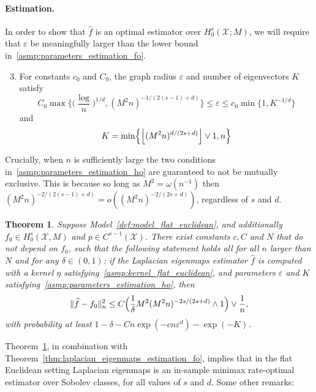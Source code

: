 \documentclass{article}
\newcommand{\floor}[1]{\left\lfloor #1 \right\rfloor}
\newcommand{\1}{\mathbf{1}}
\newcommand{\mc}[1]{\mathcal{#1}}
\newcommand{\wh}[1]{\widehat{#1}}
\theoremstyle{alden}
\theoremstyle{aldenthm}
\newtheorem{theorem}{Theorem}
\theoremstyle{definition}
\theoremstyle{remark}
\begin{document}
\paragraph{Estimation.}
In order to show that $\wh{f}$ is an optimal estimator over $H_0^s(\mc{X};M)$, we will require that $\varepsilon$ be meaningfully larger than the lower bound in~\ref{asmp:parameters_estimation_fo}.
\begin{enumerate}[label=(P\arabic*)]
	\setcounter{enumi}{2}
	\item 
	\label{asmp:parameters_estimation_ho}
	For constants $c_0$ and $C_0$, the graph radius $\varepsilon$ and number of eigenvectors $K$ satisfy
	\begin{equation}
	\label{eqn:radius_ho}
	C_0\max\biggl\{\biggl(\frac{\log}{n}\biggr)^{1/d}, (M^2n)^{-1/(2(s - 1) + d)}\biggr\} \leq \varepsilon \leq c_0\min\{1, K^{-1/d}\}
	\end{equation}
	and
	\begin{equation*}
	K = \min\Bigl\{\floor{(M^2n)^{d/(2s + d)}} \vee 1,n\Bigr\}
	\end{equation*}
\end{enumerate}
Crucially, when $n$ is sufficiently large the two conditions in~\ref{asmp:parameters_estimation_ho} are guaranteed to not be mutually exclusive. This is because so long as $M^2 = \omega(n^{-1})$ then $(M^2n)^{-2/(2(s - 1) + d)} = o((M^2n)^{-2/(2s + d)})$, regardless of $s$ and $d$.
\begin{theorem}
	\label{thm:laplacian_eigenmaps_estimation_ho}
	Suppose Model~\ref{def:model_flat_euclidean}, and additionally $f_0 \in H_0^s(\mc{X},M)$ and $p \in C^{s - 1}(\mc{X})$. There exist constants $c,C$ and $N$ that do not depend on $f_0$, such that the following statement holds all for all $n$ larger than $N$ and for any $\delta \in (0,1)$: if the Laplacian eigenmaps estimator $\wh{f}$ is computed with a kernel $\eta$ satisfying~\ref{asmp:kernel_flat_euclidean}, and parameters $\varepsilon$ and $K$ satisfying~\ref{asmp:parameters_estimation_ho}, then
	\begin{equation}
	\label{eqn:laplacian_eigenmaps_estimation_ho}
	\|\wh{f} - f_0\|_n^2 \leq C\Bigl(\frac{1}{\delta}M^2(M^2n)^{-2s/(2s + d)} \wedge 1\Bigr) \vee \frac{1}{n},
	\end{equation}
	with probability at least $1 - \delta - Cn\exp(-cn\varepsilon^d) - \exp(-K)$.
\end{theorem}
Theorem~\ref{thm:laplacian_eigenmaps_estimation_ho}, in combination with Theorem~\ref{thm:laplacian_eigenmaps_estimation_fo}, implies that in the flat Euclidean setting Laplacian eigenmaps is an in-sample minimax rate-optimal estimator over Sobolev classes, for all values of $s$ and $d$. Some other remarks:
\end{document}
